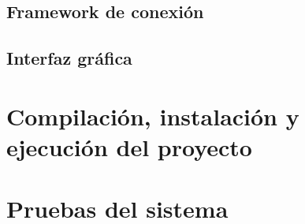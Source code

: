 \subsection{Framework de conexión}
\subsection{Interfaz gráfica}
\section{Compilación, instalación y ejecución del proyecto}

\section{Pruebas del sistema}
